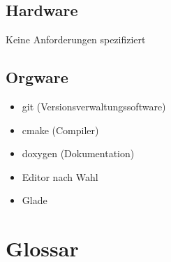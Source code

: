 \subsection{Hardware}
Keine Anforderungen spezifiziert
\subsection{Orgware}
\begin{itemize}
	\item git (Versionsverwaltungssoftware)
	\item cmake (Compiler)
	\item doxygen (Dokumentation)
	\item Editor nach Wahl
	\item Glade
\end{itemize}
\section{Glossar}

